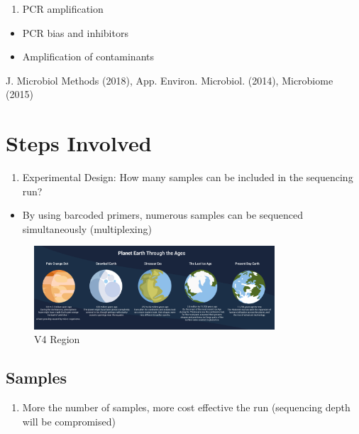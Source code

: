 \documentclass[
]{book}
\providecommand{\tightlist}{%
  \setlength{\itemsep}{0pt}\setlength{\parskip}{0pt}}
\begin{document}
\begin{enumerate}
\def\labelenumi{\arabic{enumi}.}
\setcounter{enumi}{2}
\tightlist
\item
  PCR amplification
\end{enumerate}

\begin{itemize}
\tightlist
\item
  PCR bias and inhibitors
\item
  Amplification of contaminants
\end{itemize}

J. Microbiol Methods (2018), App. Environ. Microbiol. (2014), Microbiome (2015)

\hypertarget{steps-involved}{%
\section{Steps Involved}\label{steps-involved}}

\begin{enumerate}
\def\labelenumi{\arabic{enumi}.}
\tightlist
\item
  Experimental Design: How many samples can be included in the sequencing run?
\end{enumerate}

\begin{itemize}
\tightlist
\item
  By using barcoded primers, numerous samples can be sequenced simultaneously (multiplexing)
\end{itemize}

\begin{figure}
\centering
\includegraphics[width=0.8\textwidth,height=\textheight]{./Figures/Planets.png}
\caption{V4 Region}
\end{figure}

\hypertarget{samples}{%
\subsection{Samples}\label{samples}}

\begin{enumerate}
\def\labelenumi{\arabic{enumi}.}
\tightlist
\item
  More the number of samples, more cost effective the run (sequencing depth will be compromised)
\end{enumerate}
\end{document}
